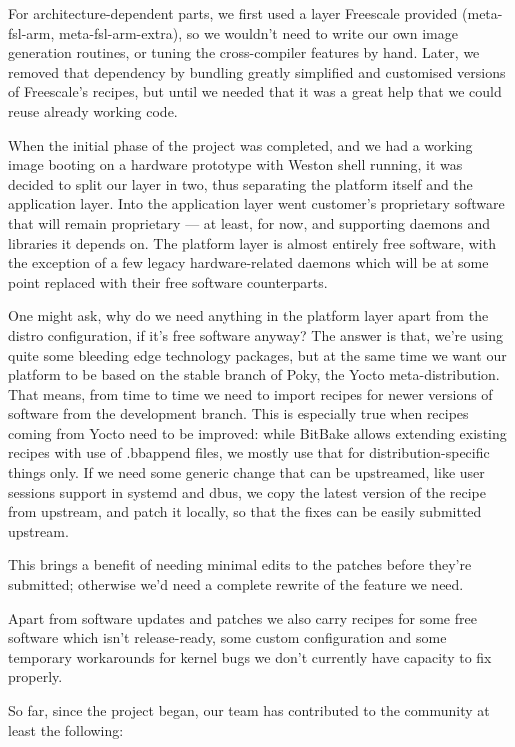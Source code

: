 \documentclass[10pt, a5paper]{article}
\begin{document}
For architecture-dependent parts, we first used a layer Freescale provided (meta-fsl-arm, meta-fsl-arm-extra), so we wouldn't need to write our own image generation routines, or tuning the cross-compiler features by hand. Later, we removed that dependency by bundling greatly simplified and customised versions of Freescale's recipes, but until we needed that it was a great help that we could reuse already working code.

When the initial phase of the project was completed, and we had a working image booting on a hardware prototype with Weston shell running, it was decided to split our layer in two, thus separating the platform itself and the application layer. Into the application layer went customer's proprietary software that will remain proprietary — at least, for now, and supporting daemons and libraries it depends on. The platform layer is almost entirely free software, with the exception of a few legacy hardware-related daemons which will be at some point replaced with their free software counterparts.

One might ask, why do we need anything in the platform layer apart from the distro configuration, if it's free software anyway? The answer is that, we're using quite some bleeding edge technology packages, but at the same time we want our platform to be based on the stable branch of Poky, the Yocto meta-distribution. That means, from time to time we need to import recipes for newer versions of software from the development branch. This is especially true when recipes coming from Yocto need to be improved: while BitBake allows extending existing recipes with use of .bbappend files, we mostly use that for distribution-specific things only. If we need some generic change that can be upstreamed, like user sessions support in systemd and dbus, we copy the latest version of the recipe from upstream, and patch it locally, so that the fixes can be easily submitted upstream.

This brings a benefit of needing minimal edits to the patches before they're submitted; otherwise we'd need a complete rewrite of the feature we need.

Apart from software updates and patches we also carry recipes for some free software which isn't release-ready, some custom configuration and some temporary workarounds for kernel bugs we don't currently have capacity to fix properly.

So far, since the project began, our team has contributed to the community at least the following:
\end{document}
